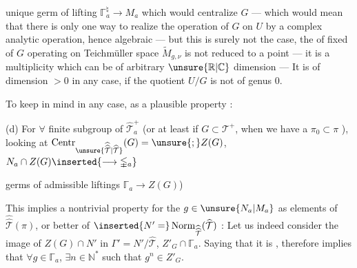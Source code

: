 
unique germ of lifting $\mathbb{\Gamma}_a^{\natural}\longrightarrow M_a$ which would centralize $G$ --- which would mean that there is  only one way to realize the  operation of $G$ on $U$ by a  complex analytic operation, hence algebraic --- but this is surely not the case, the  of fixed  of $G$ operating on Teichmüller space $\widetilde M_{g,\nu}$ is not reduced to a point --- it is  a  multiplicity which can be  of arbitrary $\unsure{\mathbb R|\mathbb C}$ dimension --- It is of dimension $>0$ in any case, if the quotient  $U/G$ is not of genus $0$.

To keep in mind in any case, as a plausible property :

(d) For $\forall$ finite subgroup  of $\widehat{\mathcal T}_a^+$ (or at least if $G\subset\mathcal T^+$, when we have a  $\pi_0\subset\pi$ ), looking at $\operatorname{Centr}_{\unsure{\widehat{\widehat{\mathcal T}}|\widehat{\mathcal T}}}(G)=\unsure{;}Z(G)$, $N_a\cap Z(G)\inserted{\longrightarrow\mathbb{\Gamma}_a}$  


germs of admissible liftings $\mathbb{\Gamma}_a\to Z(G)$)

This implies a nontrivial property for
the $g\in\unsure{N_a|M_a}$  as elements of $\widehat{\widehat{\mathcal T}}(\pi)$,
or better of $\inserted{N'=}\operatorname{Norm}_{\widehat{\widehat{\mathcal T}}}(\widehat{\mathcal T})$ :
Let us indeed consider the image  of
$Z(G)\cap N'$ in $\Gamma'=N'/\widehat{\mathcal T}$, 
$Z'_G\cap\mathbb{\Gamma}_a$. Saying that it is  ,
therefore implies that $\forall g\in\mathbb{\Gamma}_a$,  $\exists n\in\mathbb N^{*}$
such that $g^n\in Z'_G$. 

